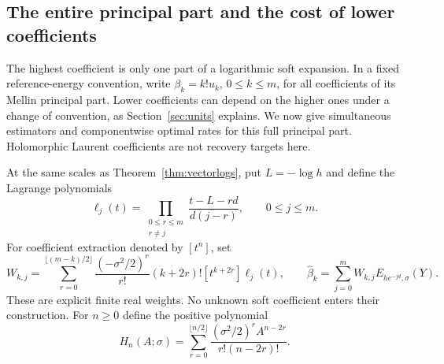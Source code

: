 \subsection{The entire principal part and the cost of lower coefficients}
\label{sec:fulljet}
The highest coefficient is only one part of a logarithmic soft
expansion. In a fixed reference-energy convention, write
$\beta_k=k!u_k$, $0\le k\le m$, for all coefficients of its Mellin
principal part. Lower coefficients can depend on the higher ones
under a change of convention, as Section~\ref{sec:units} explains.
We now give simultaneous estimators and componentwise optimal rates
for this full principal part. Holomorphic Laurent coefficients are
not recovery targets here.

At the same scales as Theorem~\ref{thm:vectorlogs}, put
$L=-\log h$ and define the Lagrange polynomials
\[
 \ell_j(t)=\prod_{\substack{0\le r\le m\\r\ne j}}
 \frac{t-L-rd}{d(j-r)},\qquad 0\le j\le m.
\]
For coefficient extraction denoted by $[t^n]$, set
\begin{equation}\label{eq:fullweights}
 W_{k,j}=\sum_{r=0}^{\lfloor(m-k)/2\rfloor}
 \frac{(-\sigma^2/2)^r}{r!}(k+2r)!
 [t^{k+2r}]\ell_j(t),\qquad
 \widehat\beta_k=\sum_{j=0}^m W_{k,j}E_{he^{-jd},\sigma}(Y).
\end{equation}
These are explicit finite real weights. No unknown soft coefficient
enters their construction. For $n\ge0$ define the positive polynomial
\[
 H_n(A;\sigma)=\sum_{r=0}^{\lfloor n/2\rfloor}
 \frac{(\sigma^2/2)^r A^{n-2r}}{r!(n-2r)!}.
\]

